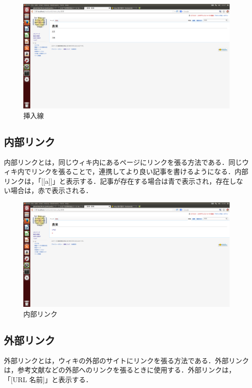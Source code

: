 \begin{figure}[htb]
\centering
\includegraphics[width=14cm]{kasen}
\caption{挿入線}\label{図}
\end{figure}


\subsection{内部リンク}
内部リンクとは，同じウィキ内にあるページにリンクを張る方法である．同じウィキ内でリンクを張ることで，連携してより良い記事を書けるようになる．内部リンクは，「[[a]]」と表示する．記事が存在する場合は青で表示され，存在しない場合は，赤で表示される．


\begin{figure}[htb]
\centering
\includegraphics[width=14cm]{naibu}
\caption{内部リンク}\label{図}
\end{figure}

\subsection{外部リンク}
外部リンクとは，ウィキの外部のサイトにリンクを張る方法である．外部リンクは，参考文献などの外部へのリンクを張るときに使用する．外部リンクは，「[URL 名前]」と表示する．



